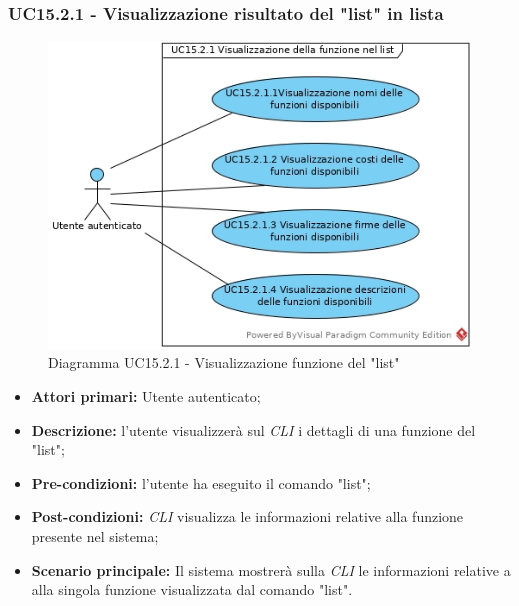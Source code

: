 \subsubsection{UC15.2.1 - Visualizzazione risultato del "list" in lista}
\begin{figure}[h]
	\centering
	\includegraphics[width=0.7\linewidth]{res/img/UC15.2.1.jpg}
	\caption{Diagramma UC15.2.1 - Visualizzazione funzione del "list"}
\end{figure}
\begin{itemize}
	\item \textbf{Attori primari:} Utente autenticato;
	\item \textbf{Descrizione:} l'utente visualizzerà sul \textit{CLI\glo} i dettagli di una funzione del "list";
	\item \textbf{Pre-condizioni:} l'utente ha eseguito il comando "list";
	\item \textbf{Post-condizioni:} \textit{CLI\glo} visualizza le informazioni relative alla funzione presente nel sistema;
	\item \textbf{Scenario principale:} Il sistema mostrerà sulla \textit{CLI\glo} le informazioni relative a alla singola funzione visualizzata dal comando "list".
\end{itemize}

